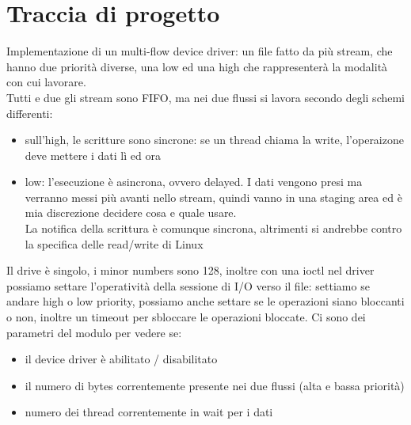 \documentclass[12pt, oneside]{extbook}
\begin{document}
\section*{Traccia di progetto}
Implementazione di un multi-flow device driver: un file fatto da più stream, che hanno due priorità diverse, una low ed una high che rappresenterà la modalità con cui lavorare.\\Tutti e due gli stream sono FIFO, ma nei due flussi si lavora secondo degli schemi differenti:
\begin{itemize}
	\item sull'high, le scritture sono sincrone: se un thread chiama la write, l'operaizone deve mettere i dati lì ed ora
	\item low: l'esecuzione è asincrona, ovvero delayed. I dati vengono presi ma verranno messi più avanti nello stream, quindi vanno in una staging area ed è mia discrezione decidere cosa e quale usare.\\La notifica della scrittura è comunque sincrona, altrimenti si andrebbe contro la specifica delle read/write di Linux
\end{itemize}
Il drive è singolo, i minor numbers sono 128, inoltre con una ioctl nel driver possiamo settare l'operatività della sessione di I/O verso il file: settiamo se andare high o low priority, possiamo anche settare se le operazioni siano bloccanti o non, inoltre un timeout per sbloccare le operazioni bloccate. Ci sono dei parametri del modulo per vedere se:
\begin{itemize}
	\item il device driver è abilitato / disabilitato
	\item il numero di bytes correntemente presente nei due flussi (alta e bassa priorità)
	\item numero dei thread correntemente in wait per i dati
\end{itemize}
\end{document}
